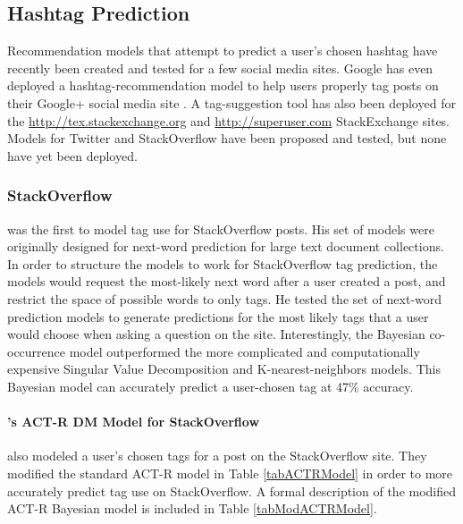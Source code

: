 \documentclass[man,floatsintext,donotrepeattitle]{apa6}
\begin{document}
\subsection{Hashtag Prediction}

Recommendation models that attempt to predict a user's chosen hashtag have recently been created and tested for a few social media sites.
Google has even deployed a hashtag-recommendation model to help users properly tag posts on their Google+ social media site \parencite{GoogleKeynote2013}.
A tag-suggestion tool has also been deployed for the \url{http://tex.stackexchange.org} and \url{http://superuser.com} StackExchange sites.
Models for Twitter and StackOverflow have been proposed and tested, but none have yet been deployed.

\subsubsection{StackOverflow}

\textcite{Kuo2011} was the first to model tag use for StackOverflow posts.
His set of models were originally designed for next-word prediction for large text document collections.
In order to structure the models to work for StackOverflow tag prediction, the models would request the most-likely next word after a user created a post, and restrict the space of possible words to only tags.
He tested the set of next-word prediction models to generate predictions for the most likely tags that a user would choose when asking a question on the site.
Interestingly, the Bayesian co-occurrence model outperformed the more complicated and computationally expensive Singular Value Decomposition and K-nearest-neighbors models.
This Bayesian model can accurately predict a user-chosen tag at 47\% accuracy.

\paragraph{\texorpdfstring{\textcite{Stanley2013}}{Stanley2013}'s ACT-R DM Model for StackOverflow}

\textcite{Stanley2013} also modeled a user's chosen tags for a post on the StackOverflow site.
They modified the standard ACT-R model in Table \ref{tabACTRModel} in order to more accurately predict tag use on StackOverflow.
A formal description of the modified ACT-R Bayesian model is included in Table \ref{tabModACTRModel}.
\end{document}
